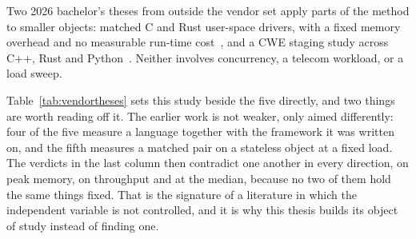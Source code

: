 \documentclass[english,oneside,a4paper,censored,csm,software-track-2020]{HYthesisML}
\begin{document}
Two 2026 bachelor's theses from outside the vendor set apply parts of the method to smaller
objects: matched C and Rust user-space drivers, with a fixed memory overhead and no measurable
run-time cost~\cite{sundvisson2026drivers}, and a CWE staging study across C++, Rust and
Python~\cite{andersson2026stdmemsafety}. Neither involves concurrency, a telecom workload, or a
load sweep.

Table~\ref{tab:vendortheses} sets this study beside the five directly, and two things are worth
reading off it. The earlier work is not weaker, only aimed differently: four of the five measure a
language together with the framework it was written on, and the fifth measures a matched pair on a
stateless object at a fixed load. The verdicts in the last column then contradict one another in
every direction, on peak memory, on throughput and at the median, because no two of them hold the
same things fixed. That is the signature of a literature in which the independent
variable is not controlled, and it is why this thesis builds its object of study instead of
finding one.
\end{document}

